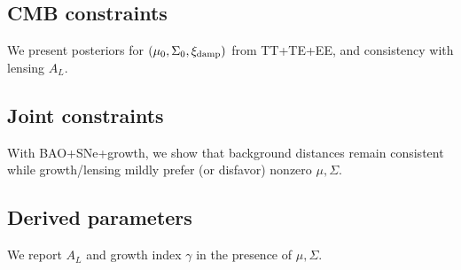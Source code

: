 
\subsection{CMB constraints}
We present posteriors for $(\mu_0,\Sigma_0,\xi_{\rm damp})$ from TT+TE+EE, and consistency with lensing $A_L$.

\subsection{Joint constraints}
With BAO+SNe+growth, we show that background distances remain consistent while growth/lensing mildly prefer (or disfavor) nonzero $\mu,\Sigma$.

\subsection{Derived parameters}
We report $A_L$ and growth index $\gamma$ in the presence of $\mu,\Sigma$.
